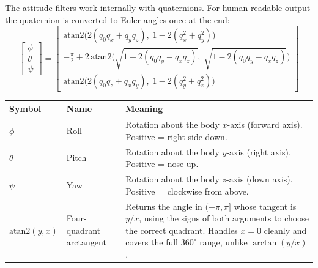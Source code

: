 \documentclass[12pt, a4paper]{article}
\begin{document}
The attitude filters work internally with quaternions.
For human-readable output the quaternion is converted to Euler angles once at
the end:
\[
  \begin{bmatrix} \phi \\ \theta \\ \psi \end{bmatrix}
  =
  \begin{bmatrix}
    \mathrm{atan2}\!\bigl(2(q_0 q_x + q_y q_z),\;
      1 - 2(q_x^2 + q_y^2)\bigr) \\[6pt]
    -\tfrac{\pi}{2} + 2\,\mathrm{atan2}\!\bigl(
      \sqrt{1 + 2(q_0 q_y - q_x q_z)},\;
      \sqrt{1 - 2(q_0 q_y - q_x q_z)}\bigr) \\[6pt]
    \mathrm{atan2}\!\bigl(2(q_0 q_z + q_x q_y),\;
      1 - 2(q_y^2 + q_z^2)\bigr)
  \end{bmatrix}
\]

\begin{center}
\begin{tabular}{@{} l p{2.8cm} p{8.0cm} @{}}
  \toprule
  Symbol & Name & Meaning \\
  \midrule
  $\phi$ & Roll &
    Rotation about the body $x$-axis (forward axis).
    Positive = right side down. \\[3pt]
  $\theta$ & Pitch &
    Rotation about the body $y$-axis (right axis).
    Positive = nose up. \\[3pt]
  $\psi$ & Yaw &
    Rotation about the body $z$-axis (down axis).
    Positive = clockwise from above. \\[3pt]
  $\mathrm{atan2}(y,x)$ & Four-quadrant arctangent &
    Returns the angle in $(-\pi, \pi]$ whose tangent is $y/x$, using
    the signs of both arguments to choose the correct quadrant.
    Handles $x = 0$ cleanly and covers the full $360^\circ$ range,
    unlike $\arctan(y/x)$. \\
  \bottomrule
\end{tabular}
\end{center}
\end{document}

